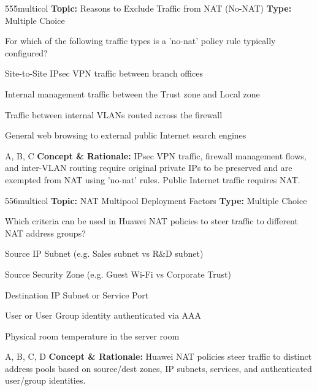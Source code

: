 \begin{qcard}{555}{multicol}
\textcolor{darkslate!75}{\small\textbf{Topic:} Reasons to Exclude Traffic from NAT (No-NAT) \hfill \textbf{Type:} Multiple Choice}\vspace{0.4em}\par
For which of the following traffic types is a 'no-nat' policy rule typically configured?
\begin{qoptions}
\item Site-to-Site IPsec VPN traffic between branch offices
\item Internal management traffic between the Trust zone and Local zone
\item Traffic between internal VLANs routed across the firewall
\item General web browsing to external public Internet search engines
\end{qoptions}
\end{qcard}
\nopagebreak
\begin{explainbox}{A, B, C}
\textbf{Concept \& Rationale:} IPsec VPN traffic, firewall management flows, and inter-VLAN routing require original private IPs to be preserved and are exempted from NAT using 'no-nat' rules. Public Internet traffic requires NAT.
\end{explainbox}

\begin{qcard}{556}{multicol}
\textcolor{darkslate!75}{\small\textbf{Topic:} NAT Multipool Deployment Factors \hfill \textbf{Type:} Multiple Choice}\vspace{0.4em}\par
Which criteria can be used in Huawei NAT policies to steer traffic to different NAT address groups?
\begin{qoptions}
\item Source IP Subnet (e.g. Sales subnet vs R\&D subnet)
\item Source Security Zone (e.g. Guest Wi-Fi vs Corporate Trust)
\item Destination IP Subnet or Service Port
\item User or User Group identity authenticated via AAA
\item Physical room temperature in the server room
\end{qoptions}
\end{qcard}
\nopagebreak
\begin{explainbox}{A, B, C, D}
\textbf{Concept \& Rationale:} Huawei NAT policies steer traffic to distinct address pools based on source/dest zones, IP subnets, services, and authenticated user/group identities.
\end{explainbox}

